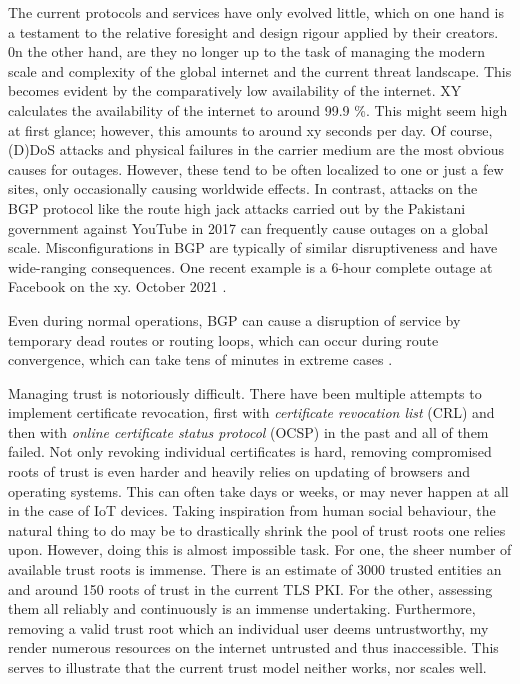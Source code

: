 \documentclass[../eva1_scion.tex]{subfiles}
\begin{document}
    The current protocols and services have only evolved little, which on one hand is a testament to the relative foresight and design rigour applied by their creators. 0n the other hand, are they no longer up to the task of managing the modern scale and complexity of the global internet and the current threat landscape. This becomes evident by the comparatively low availability of the internet. XY calculates the availability of the internet to around 99.9 \%. This might seem high at first glance; however, this amounts to around xy seconds per day. Of course, (D)DoS attacks and physical failures in the carrier medium are the most obvious causes for outages. However, these tend to be often localized to one or just a few sites, only occasionally causing worldwide effects. In contrast, attacks on the BGP protocol like the route high jack attacks carried out by the Pakistani government against YouTube in 2017 \cite{youtube_highjack} can frequently cause outages on a global scale. Misconfigurations in BGP are typically of similar disruptiveness and have wide-ranging consequences. One recent example is a 6-hour complete outage at Facebook on the xy. October 2021 \cite{facebook_oups}.

    Even during normal operations, BGP can cause a disruption of service by temporary dead routes or routing loops, which can occur during route convergence, which can take tens of minutes in extreme cases \cite{route_convergence}.

    Managing trust is notoriously difficult. There have been multiple attempts to implement certificate revocation, first with \textit{certificate revocation list} (CRL) \cite{rfc_crl} and then with \textit{online certificate status protocol} (OCSP) \cite{rfc_ocsp} in the past and all of them failed. Not only revoking individual certificates is hard, removing compromised roots of trust is even harder and heavily relies on updating of browsers and operating systems. This can often take days or weeks, or may never happen at all in the case of IoT devices. Taking inspiration from human social behaviour, the natural thing to do may be to  drastically shrink the pool of trust roots one relies upon. However, doing this is almost impossible task. For one, the sheer number of available trust roots is immense. There is an estimate of 3000 \cite{trusted_entities} trusted entities an and around 150 roots of trust in the current TLS PKI. For the other, assessing them all reliably and continuously is an immense undertaking. Furthermore, removing a valid trust root which an individual user deems untrustworthy, my render numerous resources on the internet untrusted and thus inaccessible. This serves to illustrate that the current trust model neither works, nor  scales well.
\end{document}
